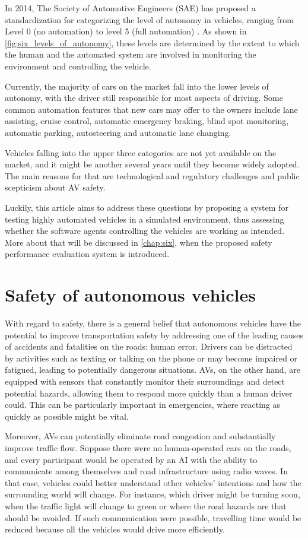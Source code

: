In 2014, The Society of Automotive Engineers (SAE) has proposed a standardization for categorizing the level of autonomy in vehicles, ranging from Level 0 (no automation) to level 5 (full automation) \cite{sae}. As shown in \autoref{fig:six_levels_of_autonomy}, these levels are determined by the extent to which the human and the automated system are involved in monitoring the environment and controlling the vehicle.

Currently, the majority of cars on the market fall into the lower levels of autonomy, with the driver still responsible for most aspects of driving. Some common automation features that new cars may offer to the owners include lane assisting, cruise control, automatic emergency braking, blind spot monitoring, automatic parking, autosteering and automatic lane changing.

Vehicles falling into the upper three categories are not yet available on the market, and it might be another several years until they become widely adopted. The main reasons for that are technological and regulatory challenges and public scepticism about AV safety.

Luckily, this article aims to address these questions by proposing a system for testing highly automated vehicles in a simulated environment, thus assessing whether the software agents controlling the vehicles are working as intended. More about that will be discussed in \autoref{chap:six}, when the proposed safety performance evaluation system is introduced.

\section{Safety of autonomous vehicles} \label{sect-2.4}
With regard to safety, there is a general belief that autonomous vehicles have the potential to improve transportation safety by addressing one of the leading causes of accidents and fatalities on the roads: human error. Drivers can be distracted by activities such as texting or talking on the phone or may become impaired or fatigued, leading to potentially dangerous situations. AVs, on the other hand, are equipped with sensors that constantly monitor their surroundings and detect potential hazards, allowing them to respond more quickly than a human driver could. This can be particularly important in emergencies, where reacting as quickly as possible might be vital.

Moreover, AVs can potentially eliminate road congestion and substantially improve traffic flow. Suppose there were no human-operated cars on the roads, and every participant would be operated by an AI with the ability to communicate among themselves and road infrastructure using radio waves. In that case, vehicles could better understand other vehicles' intentions and how the surrounding world will change. For instance, which driver might be turning soon, when the traffic light will change to green or where the road hazards are that should be avoided. If such communication were possible, travelling time would be reduced because all the vehicles would drive more efficiently.

